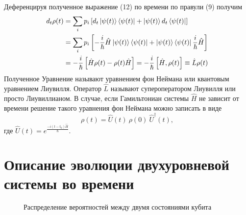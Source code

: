 \documentclass[a4paper, 10pt]{article}
\begin{document}
       Деференцируя полученное выражение (12) по времени по правули (9) получим
       \begin{equation}
        \begin{aligned}
        d_t \rho(t) &= \sum_{i} p_i \left[d_t \ket{\psi(t)} \bra{\psi(t)} + \ket{\psi(t)} d_t\bra{\psi(t)} \right]\\
                    &=\sum_{i} p_i\left[ -\frac{i}{\hbar} \hat{H} \ket{\psi(t)}\bra{\psi(t)} + \ket{\psi(t)}\bra{\psi(t)} \frac{i}{\hbar}\hat{H}\right]\\
                    &=-\frac{i}{\hbar} \left[\hat{H}\rho(t) - \rho(t) \hat{H}\right] = -\frac{i}{\hbar}\left[\hat{H},\rho(t)\right] \equiv \hat{L}\rho(t)
        \end{aligned}
       \end{equation}
       Полученное Уравнение называют уравнением фон Неймана или квантовым уравнением Лиувилля. Оператор $\hat{L}$ называют супероператором Лиувилля или просто Лиувиллианом.
       В случае, если Гамильтониан системы $\hat{H}$ не зависит от времени решение такого уравнения фон Неймана можно записать в виде
       \begin{equation}
        \rho(t) = \hat{U}(t) \ \rho(0) \ \hat{U}^\dagger(t),
       \end{equation}
       где $\hat{U}(t) = e^{\frac{-i(t-t_0)\hat{H}}{\hbar}}$.
       
        \newpage
        \section{Описание эволюции двухуровневой системы во времени}

    \begin{wrapfigure}{r}{0.5\textwidth}
        \captionsetup{justification= centering, margin = 0.1 cm}
        \caption{Распределение вероятностей между двумя состояниями кубита}
    \end{wrapfigure}
    
\end{document}
